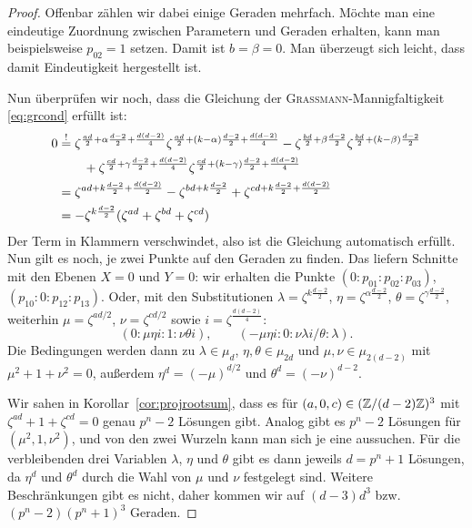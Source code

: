 \begin{proof}
Offenbar zählen wir dabei einige Geraden mehrfach. Möchte man eine eindeutige Zuordnung zwischen Parametern und Geraden erhalten, kann man beispielsweise $p_{02} = 1$ setzen. Damit ist $b = \beta = 0$. Man überzeugt sich leicht, dass damit Eindeutigkeit hergestellt ist.

Nun überprüfen wir noch, dass die Gleichung der \textsc{Grassmann}-Mannigfaltigkeit \eqref{eq:grcond} erfüllt ist:
\begin{align*}
0 &\overrel{=}^! \zeta^{\frac{ad}2+\alpha\frac{d-2}2+\frac{d(d-2)}4} \zeta^{\frac{ad}2+(k-\alpha)\frac{d-2}2+\frac{d(d-2)}4} - \zeta^{\frac{bd}2+\beta\frac{d-2}2} \zeta^{\frac{bd}2+(k-\beta)\frac{d-2}2} \\
  &\qquad + \zeta^{\frac{cd}2+\gamma\frac{d-2}2+\frac{d(d-2)}4} \zeta^{\frac{cd}2+(k-\gamma)\frac{d-2}2+\frac{d(d-2)}4} \\
  &= \zeta^{ad + k\frac{d-2}2 + \frac{d(d-2)}2} - \zeta^{bd + k\frac{d-2}2} + \zeta^{cd + k\frac{d-2}2 + \frac{d(d-2)}2} \\
  &= -\zeta^{k\frac{d-2}2}(\zeta^{ad} + \zeta^{bd} + \zeta^{cd})
\end{align*}
Der Term in Klammern verschwindet, also ist die Gleichung automatisch erfüllt. Nun gilt es noch, je zwei Punkte auf den Geraden zu finden. Das liefern Schnitte mit den Ebenen $X=0$ und $Y=0$: wir erhalten die Punkte $(0:p_{01}:p_{02}:p_{03})$, $(p_{10}:0:p_{12}:p_{13})$. Oder, mit den Substitutionen $\lambda = \zeta^{k \frac{d-2}2}$, $\eta = \zeta^{\alpha \frac{d-2}2}$, $\theta = \zeta^{\gamma\frac{d-2}2}$, weiterhin $\mu = \zeta^{ad/2}$, $\nu = \zeta^{cd/2}$ sowie $i = \zeta^{\frac{d(d-2)}4}$:
\begin{equation}
(0:\mu\eta i:1:\nu\theta i),\qquad
(-\mu\eta i:0:\nu\lambda i/\theta:\lambda).
\end{equation}
Die Bedingungen werden dann zu $\lambda \in \mu_d$, $\eta, \theta \in \mu_{2d}$ und $\mu, \nu \in \mu_{2(d-2)}$ mit $\mu^2 + 1 + \nu^2 = 0$, außerdem $\eta^d = (-\mu)^{d/2}$ und $\theta^d = (-\nu)^{d-2}$.

Wir sahen in Korollar~\ref{cor:projrootsum}, dass es für $(a,0,c) \in (\Zmod (d-2)Z)^3$ mit $\zeta^{ad} + 1 + \zeta^{cd} = 0$ genau $p^n-2$ Lösungen gibt. Analog gibt es $p^n-2$ Lösungen für $(\mu^2, 1, \nu^2)$, und von den zwei Wurzeln kann man sich je eine aussuchen. Für die verbleibenden drei Variablen $\lambda$, $\eta$ und $\theta$ gibt es dann jeweils $d=p^n+1$ Lösungen, da $\eta^d$ und $\theta^d$ durch die Wahl von $\mu$ und $\nu$ festgelegt sind. Weitere Beschränkungen gibt es nicht, daher kommen wir auf $(d-3)d^3$ bzw. $(p^n-2)(p^n+1)^3$ Geraden.


\end{proof}
